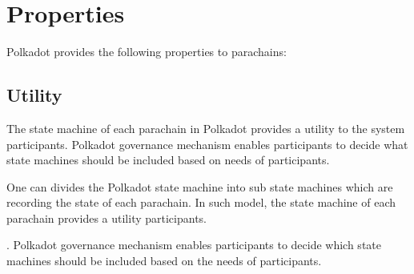 \section{Properties}\label{sec:properties}


Polkadot provides the following properties to parachains:

 
\subsection{Utility}

 The state machine of each parachain in Polkadot provides a utility to the system participants. 
 Polkadot governance mechanism enables participants to decide what state machines should be included based on needs of participants.

One can divides the Polkadot state machine into sub state machines which are recording the state of each parachain. In such model, the state machine of each parachain provides a utility participants. 
 
 .  
 Polkadot governance mechanism enables participants to decide which state machines should be included based on the needs of participants. 


